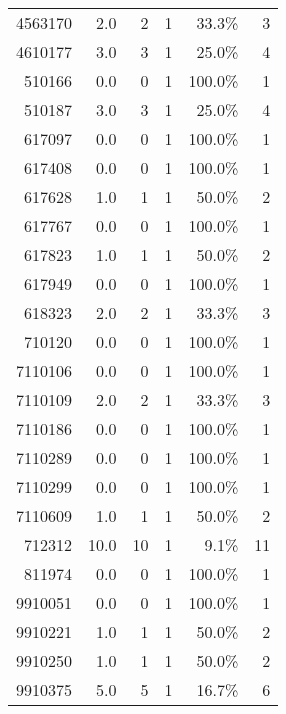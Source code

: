 \begin{longtable}{lrrrrr}
	    \multicolumn{1}{r}{4563170} & 2.0   & 2     & 1     & 33.3\% & 3 \\
	    \multicolumn{1}{r}{4610177} & 3.0   & 3     & 1     & 25.0\% & 4 \\
	    \multicolumn{1}{r}{510166} & 0.0   & 0     & 1     & 100.0\% & 1 \\
	    \multicolumn{1}{r}{510187} & 3.0   & 3     & 1     & 25.0\% & 4 \\
	    \multicolumn{1}{r}{617097} & 0.0   & 0     & 1     & 100.0\% & 1 \\
	    \multicolumn{1}{r}{617408} & 0.0   & 0     & 1     & 100.0\% & 1 \\
	    \multicolumn{1}{r}{617628} & 1.0   & 1     & 1     & 50.0\% & 2 \\
	    \multicolumn{1}{r}{617767} & 0.0   & 0     & 1     & 100.0\% & 1 \\
	    \multicolumn{1}{r}{617823} & 1.0   & 1     & 1     & 50.0\% & 2 \\
	    \multicolumn{1}{r}{617949} & 0.0   & 0     & 1     & 100.0\% & 1 \\
	    \multicolumn{1}{r}{618323} & 2.0   & 2     & 1     & 33.3\% & 3 \\
	    \multicolumn{1}{r}{710120} & 0.0   & 0     & 1     & 100.0\% & 1 \\
	    \multicolumn{1}{r}{7110106} & 0.0   & 0     & 1     & 100.0\% & 1 \\
	    \multicolumn{1}{r}{7110109} & 2.0   & 2     & 1     & 33.3\% & 3 \\
	    \multicolumn{1}{r}{7110186} & 0.0   & 0     & 1     & 100.0\% & 1 \\
	    \multicolumn{1}{r}{7110289} & 0.0   & 0     & 1     & 100.0\% & 1 \\
	    \multicolumn{1}{r}{7110299} & 0.0   & 0     & 1     & 100.0\% & 1 \\
	    \multicolumn{1}{r}{7110609} & 1.0   & 1     & 1     & 50.0\% & 2 \\
	    \multicolumn{1}{r}{712312} & 10.0  & 10    & 1     & 9.1\% & 11 \\
	    \multicolumn{1}{r}{811974} & 0.0   & 0     & 1     & 100.0\% & 1 \\
	    \multicolumn{1}{r}{9910051} & 0.0   & 0     & 1     & 100.0\% & 1 \\
	    \multicolumn{1}{r}{9910221} & 1.0   & 1     & 1     & 50.0\% & 2 \\
	    \multicolumn{1}{r}{9910250} & 1.0   & 1     & 1     & 50.0\% & 2 \\
	    \multicolumn{1}{r}{9910375} & 5.0   & 5     & 1     & 16.7\% & 6 \\

\end{longtable}

